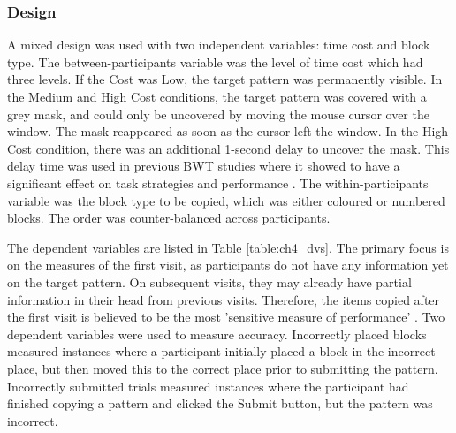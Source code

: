 \subsubsection{Design}
A mixed design was used with two independent variables: time cost and block type. The between-participants variable was the level of time cost which had three levels. If the Cost was Low, the target pattern was permanently visible. In the Medium and High Cost conditions, the target pattern was covered with a grey mask, and could only be uncovered by moving the mouse cursor over the window. The mask reappeared as soon as the cursor left the window. In the High Cost condition, there was an additional 1-second delay to uncover the mask. This delay time was used in previous BWT studies where it showed to have a significant effect on task strategies and performance \citep{Gray2006, Morgan2009, Waldron2007}. The within-participants variable was the block type to be copied, which was either coloured or numbered blocks. The order was counter-balanced across participants.

The dependent variables are listed in Table \ref{table:ch4_dvs}. The primary focus is on the measures of the first visit, as participants do not have any information yet on the target pattern. On subsequent visits, they may already have partial information in their head from previous visits. Therefore, the items copied after the first visit is believed to be the most 'sensitive measure of performance' \citep{Janssen2012}. 
Two dependent variables were used to measure accuracy. Incorrectly placed blocks measured instances where a participant initially placed a block in the incorrect place, but then moved this to the correct place prior to submitting the pattern. Incorrectly submitted trials measured instances where the participant had finished copying a pattern and clicked the Submit button, but the pattern was incorrect.

